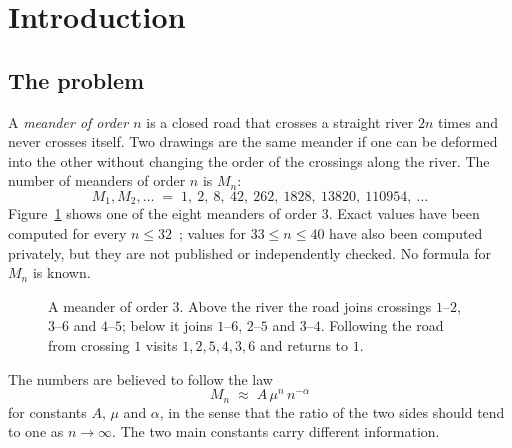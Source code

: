 \section{Introduction}\label{sec:intro}

\subsection{The problem}

A \emph{meander of order $n$} is a closed road that crosses a straight river $2n$ times and
never crosses itself. Two drawings are the same meander if one can be deformed into the other
without changing the order of the crossings along the river. The number of meanders of order
$n$ is $M_n$:
\[ M_1, M_2, \ldots \;=\; 1,\ 2,\ 8,\ 42,\ 262,\ 1828,\ 13820,\ 110954,\ \ldots \]
Figure~\ref{fig:meander} shows one of the eight meanders of order $3$. Exact values have been
computed for every $n\le 32$~\cite{JG,JensenGit}; values for $33\le n\le 40$ have also been
computed privately, but they are not published or independently checked. No formula for $M_n$
is known.

\begin{figure}[t]
\centering
{}
\caption{A meander of order $3$. Above the river the road joins crossings $1$--$2$, $3$--$6$
and $4$--$5$; below it joins $1$--$6$, $2$--$5$ and $3$--$4$. Following the road from
crossing $1$ visits $1,2,5,4,3,6$ and returns to $1$.}
\label{fig:meander}
\end{figure}

The numbers are believed to follow the law
\begin{equation}\label{eq:law}
M_n \;\approx\; A\,\mu^n\, n^{-\alpha}
\end{equation}
for constants $A$, $\mu$ and $\alpha$, in the sense that the ratio of the two sides should tend to
one as $n\to\infty$. The two main constants carry different information.

